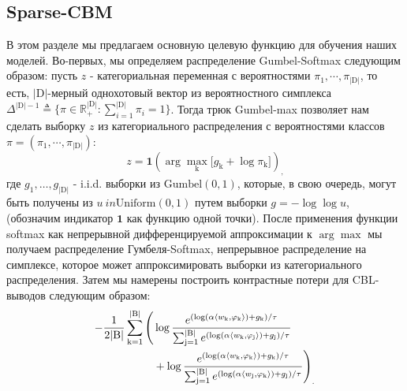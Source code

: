 \subsection{Sparse-CBM}
\label{sec:sparsecbm}

В этом разделе мы предлагаем основную целевую функцию для обучения наших моделей. Во-первых, мы определяем распределение Gumbel-Softmax \cite{jang2017categorical,DBLP:journals/corr/MaddisonMT16} следующим образом: пусть $z$ - категориальная переменная с вероятностями $\pi_1,\cdots,\pi_{|\mathrm{D}|}$, то есть, $|\mathrm{D}|$-мерный однохотовый вектор из вероятностного симплекса $\Delta^{|\mathrm{D}|-1} \triangleq \{ \pi \in \mathbb{R}_+^{|\mathrm{D}|} : \sum_{i=1}^{|\mathrm{D}|} \pi_i =1 \}$. Тогда трюк Gumbel-max \cite{Gumbel1954StatisticalTO,maddison2015a} позволяет нам сделать выборку $z$ из категориального распределения с вероятностями классов $\pi = (\pi_1, \cdots, \pi_{|\mathrm{D}|})$:
\vskip -0.15in
\[
z = \mathbf{1}\left(\arg\max \limits_{\mathrm{k}}\big[g_{\mathrm{k}} + \log \pi_{\mathrm{k}}\big] \right)_,
\]
где $g_1,\dots, g_{|\mathrm{D}|}$ - i.i.d. выборки из $\mathrm{Gumbel}(0,1)$, которые, в свою очередь, могут быть получены из $u \ in \mathrm{Uniform}(0,1)$ путем выборки $g = -\log \log u$, (обозначим индикатор $\mathbf{1}$ как функцию одной точки). После применения функции softmax как непрерывной дифференцируемой аппроксимации к $\arg \max$ мы получаем распределение Гумбеля-Softmax, непрерывное распределение на симплексе, которое может аппроксимировать выборки из категориального распределения. Затем мы намерены построить контрастные потери для CBL-выводов следующим образом: 
\begin{align*}\label{eq:gumbellos}
-\frac{1}{2|\mathrm{B}|} \sum_{\mathrm{k}=1}^{|\mathrm{B}|}\Bigg(&\log \frac{e^{\left(\log(\alpha \langle w_{\mathrm{k}}, \varphi_{\mathrm{k}}\rangle) + g_{\mathrm{k}}\right)/\tau}}{\sum_{\mathrm{j}=1}^{|\mathrm{B}|}e^{\left(\log(\alpha \langle w_{\mathrm{k}}, \varphi_{\mathrm{j}}\rangle) + g_{\mathrm{j}}\right)/\tau}} \notag \\ 
&+ \log \frac{e^{\left(\log(\alpha \langle w_{\mathrm{k}}, \varphi_{\mathrm{k}}\rangle) + g_{\mathrm{k}}\right)/\tau}}{\sum_{\mathrm{j}=1}^{|\mathrm{B}|}e^{\left(\log(\alpha \langle w_{\mathrm{j}}, \varphi_{\mathrm{k}}\rangle) + g_{\mathrm{j}}\right)/\tau}} \Bigg)_.
\end{align*}

